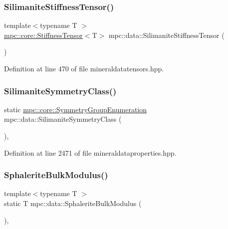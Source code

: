 \subsubsection{\texorpdfstring{Silimanite\+Stiffness\+Tensor()}{SilimaniteStiffnessTensor()}}
{\footnotesize\ttfamily template$<$typename T $>$ \\
\mbox{\hyperlink{structmpc_1_1core_1_1_stiffness_tensor}{mpc\+::core\+::\+Stiffness\+Tensor}}$<$T$>$ mpc\+::data\+::\+Silimanite\+Stiffness\+Tensor (\begin{DoxyParamCaption}{ }\end{DoxyParamCaption})}



Definition at line 470 of file mineraldatatensors.\+hpp.

\mbox{\label{namespacempc_1_1data_a9f7ee0e6670cb4d6c094ec76116775dd}} 
\subsubsection{\texorpdfstring{Silimanite\+Symmetry\+Class()}{SilimaniteSymmetryClass()}}
{\footnotesize\ttfamily static \mbox{\hyperlink{namespacempc_1_1core_a9d979684062547055a0ef5c13077bad8}{mpc\+::core\+::\+Symmetry\+Group\+Enumeration}} mpc\+::data\+::\+Silimanite\+Symmetry\+Class (\begin{DoxyParamCaption}{ }\end{DoxyParamCaption})\hspace{0.3cm}{\ttfamily [inline]}, {\ttfamily [static]}}



Definition at line 2471 of file mineraldataproperties.\+hpp.

\mbox{\label{namespacempc_1_1data_a8674a9a41026ea2946526fcb6a073fbc}} 
\subsubsection{\texorpdfstring{Sphalerite\+Bulk\+Modulus()}{SphaleriteBulkModulus()}}
{\footnotesize\ttfamily template$<$typename T $>$ \\
static T mpc\+::data\+::\+Sphalerite\+Bulk\+Modulus (\begin{DoxyParamCaption}{ }\end{DoxyParamCaption})\hspace{0.3cm}{\ttfamily [inline]}, {\ttfamily [static]}}



